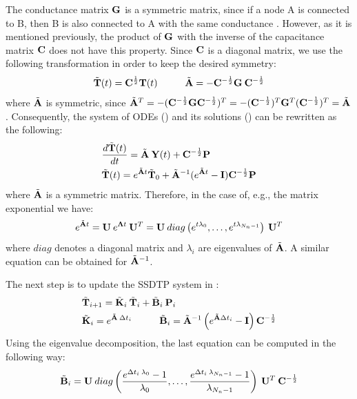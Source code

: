 The conductance matrix $\mathbf{G}$ is a symmetric matrix, since if a node A is connected to B, then B is also connected to A with the same conductance \cite{huang2003}. However, as it is mentioned previously, the product of $\mathbf{G}$ with the inverse of the capacitance matrix $\mathbf{C}$ does not have this property. Since $\mathbf{C}$ is a diagonal matrix, we use the following transformation in order to keep the desired symmetry:
\begin{equation} \label{eq:substitution}
  \tilde{\v{T}}(t) = \m{C}^{\frac{1}{2}} \v{T}(t) \hs \tilde{\m{A}} = -\m{C}^{-\frac{1}{2}} \m{G} \: \m{C}^{-\frac{1}{2}}
\end{equation}
where $\tilde{\mathbf{A}}$ is symmetric, since $\tilde{\mathbf{A}}^T = -(\mathbf{C}^{-\frac{1}{2}} \mathbf{G} \mathbf{C}^{-\frac{1}{2}})^T = -(\mathbf{C}^{-\frac{1}{2}})^T \mathbf{G}^T (\mathbf{C}^{-\frac{1}{2}})^T = \tilde{\mathbf{A}}$. Consequently, the system of ODEs () and its solutions () can be rewritten as the following:
\begin{align*}
  & \frac{d\tilde{\mathbf{T}}(t)}{dt} = \tilde{\mathbf{A}} \: \mathbf{Y}(t) + \mathbf{C}^{-\frac{1}{2}} \mathbf{P} \\
  & \tilde{\mathbf{T}}(t) = e^{\tilde{\mathbf{A}} t} \tilde{\mathbf{T}}_0 + \tilde{\mathbf{A}}^{-1} (e^{\tilde{\mathbf{A}} t} - \mathbf{I}) \mathbf{C}^{-\frac{1}{2}} \mathbf{P}
\end{align*}
where $\tilde{\mathbf{A}}$ is a symmetric matrix. Therefore, in the case of, e.g., the matrix exponential we have:
\begin{equation} \label{eq:matrix-exponential}
  e^{\tilde{\mathbf{A}} t} = \mathbf{U} \: e^{\mathbf{\Lambda} t} \: \mathbf{U}^T = \mathbf{U} \: diag \left( e^{t \lambda_0}, \dots, e^{t \lambda_{N_n - 1}} \right) \: \mathbf{U}^T
\end{equation}
where $diag$ denotes a diagonal matrix and $\lambda_i$ are eigenvalues of $\tilde{\mathbf{A}}$. A similar equation can be obtained for $\tilde{\mathbf{A}}^{-1}$.

The next step is to update the SSDTP system in :
\begin{align}
  & \tv{T}_{i+1} = \tm{K}_i \: \tv{T}_i + \tm{B}_i \: \v{P}_i \label{eq:recurrent-equation} \\
  & \tm{K}_i = e^{\tm{A} \: \Delta t_i} \hs \tm{B}_i = \tm{A}^{-1} \left( e^{\tm{A} \Delta t_i} - \m{I} \right) \m{C}^{-\frac{1}{2}} \nonumber
\end{align}
Using the eigenvalue decomposition, the last equation can be computed in the following way:
\[
  \tilde{\mathbf{B}}_i = \mathbf{U} \: diag \left( \frac{e^{\Delta t_i \: \lambda_0} - 1}{\lambda_0}, \dots, \frac{e^{\Delta t_i \: \lambda_{N_n - 1}} - 1}{\lambda_{N_n - 1}} \right) \: \mathbf{U}^T \: \mathbf{C}^{-\frac{1}{2}}
\]

